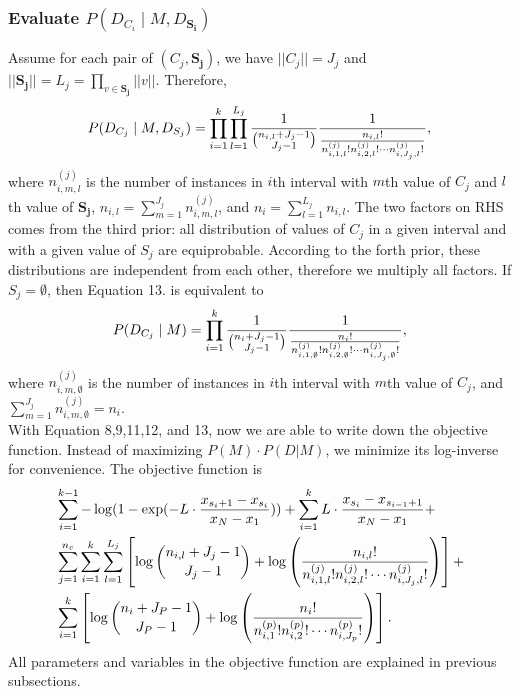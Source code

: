{\subsubsection{Evaluate $P(D_{C_i} \mid M, D_{\boldsymbol{S_i}})$}
Assume for each pair of $(C_j, \boldsymbol{S_j})$, we have $||C_j || = J_j$ and $|| \boldsymbol{S_j} || = L_j = \prod_{v \in \boldsymbol{S_j}} || v ||$. Therefore,
\begin{equation}
P(D_{C_j}  \mid M, D_{S_j}) =
\prod_{i=1}^{k} \prod_{l=1}^{L_j} {{1}\over{{n_{i,l} + J_j - 1}\choose{J_j-1}}}
{{1}\over{ {{n_{i,l}}!}\over{ {n^{(j)}_{i,1,l} !} {n^{(j)}_{i,2,l} !} \cdots {n^{(j)}_{i,J_j,l} !}}  }},
\end{equation}
where $n^{(j)}_{i,m,l}$ is the number of instances in $i$th interval with $m$th value of $C_j$ and $l$th value of $\boldsymbol{S_j}$, $n_{i,l} = \sum_{m=1}^{J_j} n^{(j)}_{i,m,l}$, and $n_i = \sum_{l=1}^{L_j} n_{i,l}$. The two factors on RHS comes from the third prior: all distribution of values of $C_j$ in a given interval and with a given value of $S_j$ are equiprobable. According to the forth prior, these distributions are independent from each other, therefore we multiply all factors. If $S_j = \emptyset$, then Equation 13. is equivalent to
\begin{equation}
P(D_{C_j}  \mid M) =
\prod_{i=1}^{k}  {{1}\over{{n_{i} + J_j - 1}\choose{J_j-1}}}
{{1}\over{ {{n_{i}}!}\over{ {n^{(j)}_{i,1,\emptyset} !} {n^{(j)}_{i,2,\emptyset} !} \cdots {n^{(j)}_{i,J_j,\emptyset} !}}  }},
\end{equation}
where $n^{(j)}_{i,m,\emptyset}$ is the number of instances in $i$th interval with $m$th value of $C_j$, and $\sum_{m=1}^{J_j} n^{(j)}_{i,m,\emptyset} = n_i$. \\

With Equation 8,9,11,12, and 13, now we are able to write down the objective function. Instead of maximizing $P(M) \cdot P(D|M)$, we minimize its log-inverse for convenience. The objective function is
\begin{equation}
\begin{aligned}
& \sum_{i=1}^{k-1} - \log(1 - {\exp(- L \cdot {{x_{s_i+1} - x_{s_i}}\over{x_N - x_1}})}) +  \sum_{i=1}^{k} L \cdot {{x_{s_{i}} - x_{s_{i-1} + 1}}\over{x_N - x_1}} +\\
&  \sum_{j=1}^{n_c} \sum_{i=1}^{k}  \sum_{l=1}^{L_j} \left[  \log{{n_{i,l} + J_j - 1}\choose{J_j-1}} + \log \left( { {{n_{i,l}}!}\over{ {n^{(j)}_{i,1,l} !} {n^{(j)}_{i,2,l} !} \cdots {n^{(j)}_{i,J_j,l} !}} } \right) \right] + \\
& \sum_{i=1}^k \left[  \log {{n_{i} + J_P - 1}\choose{J_P-1}} + \log \left( { {{n_i}!}\over{ {n^{(p)}_{i,1} !} {n^{(p)}_{i,2} !} \cdots {n^{(p)}_{i,J_p} !}} } \right) \right].
\end{aligned}
\end{equation}
All parameters and variables in the objective function are explained in previous subsections.
}
